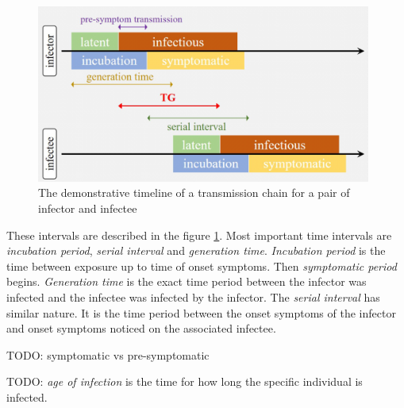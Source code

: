 \documentclass[
  digital, %
  oneside, %
  lof,     %
  lot,     %
]{fithesis4}
\begin{document}
\begin{figure}[h]
  \begin{center}
    \includegraphics[width=11cm]{static/zhao2020_terms.png}
  \end{center}
  \caption{The demonstrative timeline of a transmission chain for a pair of infector and infectee \cite{zhao2020}}
  \label{fig:zhao-transmissive-chain-example}
\end{figure}

These intervals are described in the figure 
\ref{fig:zhao-transmissive-chain-example}.
Most important time intervals are 
\textit{incubation period}, \textit{serial interval} and \textit{generation time}.
\textit{Incubation period} is the time between exposure up to time of onset 
symptoms. Then \textit{symptomatic period} begins.
\textit{Generation time} is the exact time period between 
the infector was infected and the infectee was infected by the infector.
The \textit{serial interval} has similar nature. It is 
the time period between the onset symptoms of the infector 
and onset symptoms noticed on the associated infectee.






TODO: symptomatic vs pre-symptomatic

TODO: \textit{age of infection} is the time for how long the specific individual is infected.
\end{document}

